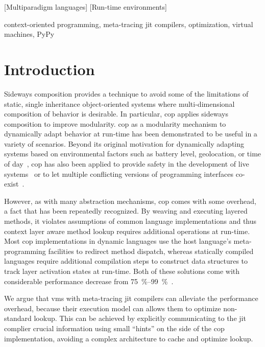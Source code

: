 \documentclass[preprint,english,10pt,nonatbib]{sigplanconf}
\begin{document}
[Mul\-ti\-par\-a\-digm languages]
[Run-time environments]

\keywords
context-oriented programming,
meta-tracing \acs{jit} compilers,
optimization,
virtual machines,
PyPy

\section{Introduction}

Sideways composition provides a technique to avoid some of the limitations of
static, single inheritance object-oriented systems where multi-dimensional
composition of behavior is desirable. In particular, \acrlong{cop} applies
sideways composition to improve modularity. \ac{cop} as a modularity mechanism
to dynamically adapt behavior at run-time has been demonstrated to be useful in
a variety of scenarios. Beyond its original motivation for dynamically adapting
systems based on environmental factors such as battery level, geolocation, or
time of day~\cite{hirschfeld+:2008:context-oriented-programming}, \ac{cop} has
also been applied to provide safety in the development of live
systems~\cite{lincke+:2012:scoping-changes} or to let multiple conflicting
versions of programming interfaces
co-exist~\cite{felgentreff:2013:tool-building}.

However, as with many abstraction mechanisms, \ac{cop} comes with some
overhead, a fact that has been repeatedly recognized. By weaving and executing
layered methods, it violates assumptions of common language implementations and
thus context layer aware method lookup requires additional operations at
run-time. Most \ac{cop} implementations in dynamic languages use the host
language's meta-programming facilities to redirect method dispatch, whereas
statically compiled languages require additional compilation steps to construct
data structures to track layer activation states at run-time. Both of these
solutions come with considerable performance decrease from
\SIrange{75}{99}{\percent}~\cite{appeltauer+:2009:comparison-context-oriented}.

We argue that \acp{vm} with meta-tracing \ac{jit} compilers can alleviate the
performance overhead, because their execution model can allows them to optimize
non-standard lookup. This can be achieved by explicitly communicating to the
\ac{jit} complier crucial information using small ``hints'' on the side of the
\ac{cop} implementation, avoiding a complex architecture to cache and optimize
lookup.
\end{document}
